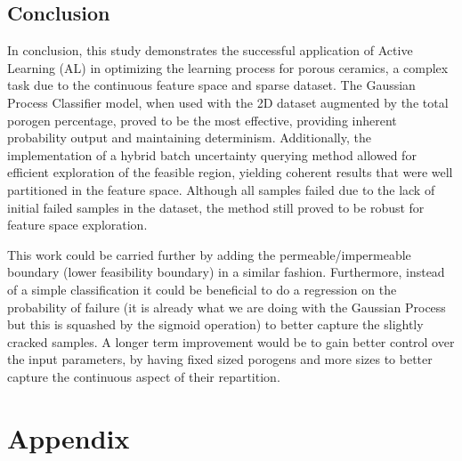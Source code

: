 \documentclass[10pt]{article}
\newenvironment{Figure}
  {\par\medskip\noindent\minipage{\linewidth}}
  {\endminipage\par\medskip}
\begin{document}
\begin{multicols}{2}
\section{Conclusion}

In conclusion, this study demonstrates the successful application of Active Learning (AL) in optimizing the learning process for porous ceramics, a complex task due to the continuous feature space and sparse dataset. The Gaussian Process Classifier model, when used with the 2D dataset augmented by the total porogen percentage, proved to be the most effective, providing inherent probability output and maintaining determinism. Additionally, the implementation of a hybrid batch uncertainty querying method allowed for efficient exploration of the feasible region, yielding coherent results that were well partitioned in the feature space. Although all samples failed due to the lack of initial failed samples in the dataset, the method still proved to be robust for feature space exploration.

This work could be carried further by adding the permeable/impermeable boundary (lower feasibility boundary) in a similar fashion. Furthermore, instead of a simple classification it could be beneficial to do a regression on the probability of failure (it is already what we are doing with the Gaussian Process but this is squashed by the sigmoid operation) to better capture the slightly cracked samples. A longer term improvement would be to gain better control over the input parameters, by having fixed sized porogens and more sizes to better capture the continuous aspect of their repartition.

\end{multicols}

\pagebreak


\section{Appendix}

\end{document}

